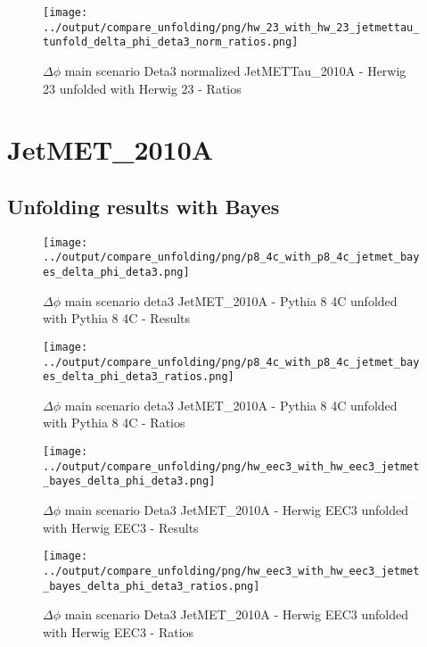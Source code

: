 \documentclass[11pt]{book}
\begin{document}
\begin{figure}[ht]
\centering
\texttt{[image: ../output/compare\_unfolding/png/hw\_23\_with\_hw\_23\_jetmettau\_tunfold\_delta\_phi\_deta3\_norm\_ratios.png]}
\caption{$\Delta\phi$ main scenario Deta3 normalized JetMETTau\_2010A - Herwig 23 unfolded with Herwig 23 - Ratios}
\label{hw_23_hw_23_jetmettau_tunfold_delta_phi_deta3_norm_b}
\end{figure}



\clearpage
\section{JetMET\_2010A}
\subsection{Unfolding results with Bayes}

\begin{figure}[ht]
\centering
\texttt{[image: ../output/compare\_unfolding/png/p8\_4c\_with\_p8\_4c\_jetmet\_bayes\_delta\_phi\_deta3.png]}
\caption{$\Delta\phi$ main scenario deta3 JetMET\_2010A - Pythia 8 4C unfolded with Pythia 8 4C - Results}
\label{p8_p8_jetmet_bayes_delta_phi_deta3_a}
\end{figure}

\begin{figure}[ht]
\centering
\texttt{[image: ../output/compare\_unfolding/png/p8\_4c\_with\_p8\_4c\_jetmet\_bayes\_delta\_phi\_deta3\_ratios.png]}
\caption{$\Delta\phi$ main scenario deta3 JetMET\_2010A - Pythia 8 4C unfolded with Pythia 8 4C - Ratios}
\label{p8_p8_jetmet_bayes_delta_phi_deta3_b}
\end{figure}

\begin{figure}[ht]
\centering
\texttt{[image: ../output/compare\_unfolding/png/hw\_eec3\_with\_hw\_eec3\_jetmet\_bayes\_delta\_phi\_deta3.png]}
\caption{$\Delta\phi$ main scenario Deta3 JetMET\_2010A - Herwig EEC3 unfolded with Herwig EEC3 - Results}
\label{hw_eec3_hw_eec3_jetmet_bayes_delta_phi_deta3_a}
\end{figure}

\begin{figure}[ht]
\centering
\texttt{[image: ../output/compare\_unfolding/png/hw\_eec3\_with\_hw\_eec3\_jetmet\_bayes\_delta\_phi\_deta3\_ratios.png]}
\caption{$\Delta\phi$ main scenario Deta3 JetMET\_2010A - Herwig EEC3 unfolded with Herwig EEC3 - Ratios}
\label{hw_eec3_hw_eec3_jetmet_bayes_delta_phi_deta3_b}
\end{figure}
\end{document}
